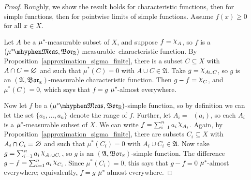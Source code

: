 \documentclass[
twoside=true,
paper=letter,
fontsize=9pt,
pagesize=auto,
leqno,
openany,
headsepline,
overfullrule,
]{scrbook}
\theoremstyle{plain}
\theoremstyle{plain}
\theoremstyle{definition}
\theoremstyle{bfnoteitalic}
\theoremstyle{bfnoteroman}
\newcommand{\sigalg}[1]{\mathfrak{#1}}
\newcommand{\borel}{\mathfrak{Bor}}
\newcommand{\charfunction}[1]{\mathop{{\raisebox{2pt}{$\chi$}}_{#1}}}
\newcommand{\mtset}{\hbox{\large{$\varnothing$}}}
\newcommand{\preimage}[1]{\mathop{#1^{\leftarrow}}}
\newcommand{\R}{\mathbb{R}}
\newcommand{\meets}{\cap}
\newcommand{\sigmaalgebra}{\sigalg{A}}
\newcommand{\measurable}[1]{{#1}\mhyphen\mathfrak{Meas}}
\newcommand{\kernast}{\ast\kern-1pt}
\newcommand{\mbmeasurable}{$(\measurable{\measure^\kernast},\borel_\R)$\hyp{}measurable}
\newcommand{\measurespace}{X}
\newcommand{\measure}{\mu}
\begin{document}
\begin{proof}
Roughly, we show the result holds for characteristic functions, then for simple functions, then for pointwise limits of simple functions. 
Assume $f(x)\geq 0$ for all $x\in\measurespace$.

Let $A$ be a  $\measure^\kernast$-measurable subset of $\measurespace$, and suppose $f=\charfunction{A}$, so $f$ is a \mbmeasurable\ characteristic function. By Proposition~\ref{approximation_sigma_finite}, there is a subset $C\subseteq\measurespace$ with $A\meets C =\mtset$ and  such that $\measure^*(C) = 0$ with $A\cup C\in \sigmaalgebra$.
Take $g=\charfunction{A\cup C}$, so $g$ is an $(\sigmaalgebra,\borel_\R)$\hyp{}measurable characteristic function. Then $g-f = \charfunction{C}$, and $\measure^*(C) = 0$, which says that $f=g$ $\measure^\kernast$-almost everywhere.

Now let $f$ be a $(\measurable{\measure^\kernast},\borel_\R)$-simple function, so by definition we can let the set $\{a_1,\ldots, a_n\}$ denote the range of $f$. Further, let $A_i = \preimage{f}(a_i)$, so each $A_i$ is a $\measure^\kernast$-measurable subset of $\measurespace$. We can write $f=\sum_{i=1}^n a_i\charfunction{A_i}$.
Again, by Proposition~\ref{approximation_sigma_finite}, there are subsets $C_i\subseteq\measurespace$ with $A_i\meets C_i =\mtset$ and  such that $\measure^*(C_i) = 0$ with $A_i\cup C_i\in \sigmaalgebra$.  
Now take $g=\sum_{i=1}^n a_i\charfunction{A_i\cup C_i}$, so $g$ is an $(\sigmaalgebra,\borel_\R)$-simple function. The difference $g-f = \sum_{i=1}^n a_i\charfunction{C_i}$. Since $\measure^*(C_i)=0$, this says that $g-f = 0$ $\measure^\kernast$-almost everywhere; equivalently, $f=g$ $\measure^\kernast$-almost everywhere.


\end{proof}
\end{document}
